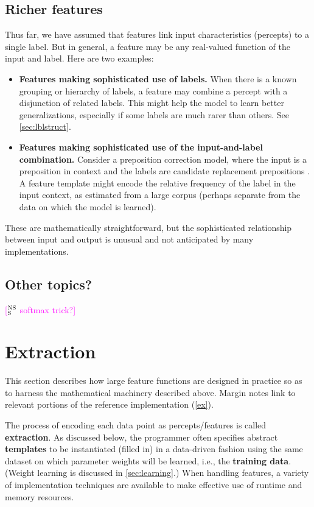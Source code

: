 \documentclass[11pt,letterpaper]{article}
\newcommand{\ensuretext}[1]{#1}
\newcommand{\nssmarker}{\ensuretext{\textcolor{magenta}{\ensuremath{^{\textsc{NS}}_{\textsc{S}}}}}}
\newcommand{\arkcomment}[3]{\ensuretext{\textcolor{#3}{[#1 #2]}}}
\newcommand{\nss}[1]{\arkcomment{\nssmarker}{#1}{magenta}}
\begin{document}
\subsection{Richer features}\label{sec:richer}

Thus far, we have assumed that features link input characteristics (percepts) 
to a single label. But in general, a feature may be any real-valued function of the input and label.
Here are two examples:

\begin{itemize}
\item \textbf{Features making sophisticated use of labels.} 
When there is a known grouping or hierarchy of labels, a feature may combine a percept 
with a disjunction of related labels. This might help the model to learn better generalizations, 
especially if some labels are much rarer than others. See \cref{sec:lblstruct}.

\item \textbf{Features making sophisticated use of the input-and-label combination.}
Consider a preposition correction model, where the input is a preposition in context 
and the labels are candidate replacement prepositions \citep[as in][]{han-10}. 
A feature template might encode the relative frequency of the label in the input context, 
as estimated from a large corpus (perhaps separate from the data on which the model is learned).
\end{itemize}

These are mathematically straightforward, but the sophisticated relationship between input and output 
is unusual and not anticipated by many implementations.

\subsection{Other topics?}

\nss{softmax trick?}

\section{Extraction}\label{sec:extraction}

This section describes how large feature functions are designed in practice
so as to harness the mathematical machinery described above.
Margin notes link to relevant portions of the reference implementation (\cref{ex}).

The process of encoding 
each data point as percepts\slash features is called \textbf{extraction}.
As discussed below, the programmer often specifies abstract \textbf{templates} 
to be instantiated (filled in) in a data-driven fashion
using the same dataset on which parameter weights will be learned, 
i.e., the \textbf{training data}. (Weight learning is discussed in \cref{sec:learning}.)
When handling features, a variety of implementation techniques 
are available to make effective use of runtime and memory resources.
\end{document}
